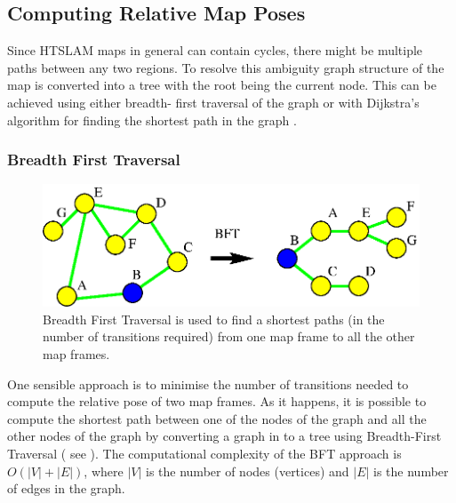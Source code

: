 



\subsection{Computing Relative Map Poses}
\label{sec:relative_poses}

Since HTSLAM maps in general can contain cycles, there might be
multiple paths between any two regions. To resolve this ambiguity
graph structure of the map is converted into a tree with the root
being the current node. This can be achieved using either breadth-
first traversal of the graph or with Dijkstra's algorithm for
finding the shortest path in the graph \cite{dijkstra_shortest_path}.

\subsubsection{Breadth First Traversal}

\begin{figure}
\begin{center}
\includegraphics[width=12cm]{Pics/fig_bft}
\end{center}
\caption{Breadth First Traversal is used to find a shortest paths (in
the number of transitions required) from one map frame to all the
other map frames.}
\label{fig:bst}
\end{figure}

One sensible approach is to minimise the number of transitions needed
to compute the relative pose of two map frames. As it happens, it
is possible to compute the shortest path between one of the nodes of
the graph and all the other nodes of the graph by converting a graph
in to a tree using Breadth-First Traversal ( see ).
The computational complexity of the BFT approach is $O(|V| + |E|)$,
where $|V|$ is the number of nodes (vertices) and $|E|$ is the number of
edges in the graph.


